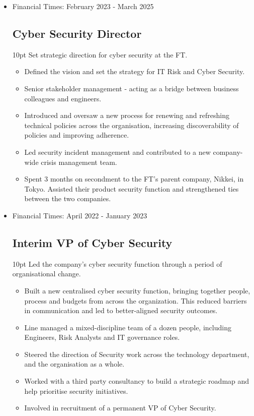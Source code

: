 \documentclass[a4paper]{article}
\newenvironment{detail}{\begin{adjustwidth}{10pt}{}}{\end{adjustwidth}}
\begin{document}
\begin{itemize}


\item Financial Times: February 2023 - March 2025
\subsection*{Cyber Security Director}
\begin{detail}
Set strategic direction for cyber security at the FT.

\begin{itemize}
	\item Defined the vision and set the strategy for IT Risk and Cyber Security.
	\item Senior stakeholder management - acting as a bridge between business colleagues and engineers.
	\item Introduced and oversaw a new process for renewing and refreshing technical policies across the organisation, increasing discoverability of policies and improving adherence.
	\item Led security incident management and contributed to a new company-wide crisis management team.
	\item Spent 3 months on secondment to the FT's parent company, Nikkei, in Tokyo.  Assisted their product security function and strengthened ties between the two companies.
\end{itemize}
\end{detail}

\item Financial Times: April 2022 - January 2023
\subsection*{Interim VP of Cyber Security}
\begin{detail}
Led the company's cyber security function through a period of organisational change.

\begin{itemize}
	\item Built a new centralised cyber security function, bringing together people, process and budgets from across the organization.  This reduced barriers in communication and led to better-aligned security outcomes.
	\item Line managed a mixed-discipline team of a dozen people, including Engineers, Risk Analysts and IT governance roles.
	\item Steered the direction of Security work across the technology department, and the organisation as a whole.
	\item Worked with a third party consultancy to build a strategic roadmap and help prioritise security initiatives.
	\item Involved in recruitment of a permanent VP of Cyber Security.
\end{itemize}
\end{detail}


\end{itemize}
\end{document}
